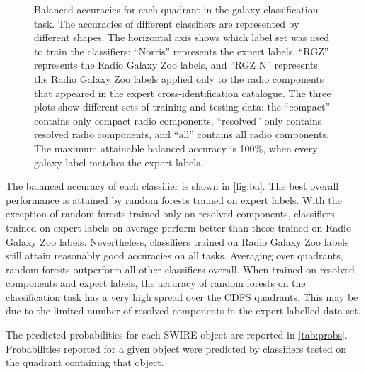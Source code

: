 \documentclass[fleqn,usenatbib,usedcolumn]{mnras}
\begin{document}
\begin{figure}
  \caption{Balanced accuracies for each quadrant in the galaxy
    classification task. The accuracies of different classifiers are represented
    by different shapes. The horizontal axis shows which label set was used to
    train the classifiers: ``Norris'' represents the expert labels, ``RGZ''
    represents the Radio Galaxy Zoo labels, and ``RGZ N'' represents the Radio
    Galaxy Zoo labels applied only to the radio components that appeared in the
    expert cross-identification catalogue. The three plots show different sets
    of training and testing data: the ``compact'' contains only compact radio
    components, ``resolved'' only contains resolved radio components, and
    ``all'' contains all radio components. The maximum attainable balanced
    accuracy is 100\%, when every galaxy label matches the expert labels.
    \label{fig:ba}}
  \end{figure}

  The balanced accuracy of each classifier is shown in \autoref{fig:ba}. The
  best overall performance is attained by random forests trained on expert
  labels. With the exception of random forests trained only on resolved
  components, classifiers trained on expert labels on average perform better
  than those trained on Radio Galaxy Zoo labels. Nevertheless, classifiers
  trained on Radio Galaxy Zoo labels still attain reasonably good accuracies on
  all tasks. Averaging over quadrants, random forests outperform all other
  classifiers overall. When trained on resolved components and expert labels,
  the accuracy of random forests on the classification task has a very high
  spread over the CDFS quadrants. This may be due to the limited number of
  resolved components in the expert-labelled data set.

  The predicted probabilities for each SWIRE object are
  reported in \autoref{tab:probs}. Probabilities reported for a given object
  were predicted by classifiers tested on the quadrant containing that object.
\end{document}
